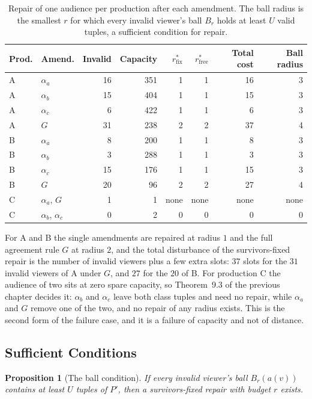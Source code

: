 \documentclass[11pt,twoside,openright]{book}
\theoremstyle{plain}
\newtheorem{proposition}[theorem]{Proposition}
\theoremstyle{definition}
\theoremstyle{remark}
\begin{document}
\begin{table}[ht]
\centering
\begin{tabular}{@{}llrrrrrr@{}}
\toprule
Prod. & Amend. & Invalid & Capacity & $r^\ast_{\mathrm{fix}}$ & $r^\ast_{\mathrm{free}}$ & Total cost & Ball radius\\
\midrule
A & $\alpha_a$ & 16 & 351 & 1 & 1 & 16 & 3\\
A & $\alpha_b$ & 15 & 404 & 1 & 1 & 15 & 3\\
A & $\alpha_c$ & 6 & 422 & 1 & 1 & 6 & 3\\
A & $G$ & 31 & 238 & 2 & 2 & 37 & 4\\
B & $\alpha_a$ & 8 & 200 & 1 & 1 & 8 & 3\\
B & $\alpha_b$ & 3 & 288 & 1 & 1 & 3 & 3\\
B & $\alpha_c$ & 15 & 176 & 1 & 1 & 15 & 3\\
B & $G$ & 20 & 96 & 2 & 2 & 27 & 4\\
C & $\alpha_a$, $G$ & 1 & 1 & none & none & none & none\\
C & $\alpha_b$, $\alpha_c$ & 0 & 2 & 0 & 0 & 0 & 0\\
\bottomrule
\end{tabular}
\caption{Repair of one audience per production after each amendment. The ball radius is the smallest $r$ for which every invalid viewer's ball $B_r$ holds at least $U$ valid tuples, a sufficient condition for repair.}\label{tab:repair}
\end{table}

For A and B the single amendments are repaired at radius $1$ and the full agreement rule $G$ at radius $2$, and the total disturbance of the survivors-fixed repair is the number of invalid viewers plus a few extra slots: $37$ slots for the $31$ invalid viewers of A under $G$, and $27$ for the $20$ of B. For production C the audience of two sits at zero spare capacity, so Theorem~9.3 of the previous chapter decides it: $\alpha_b$ and $\alpha_c$ leave both class tuples and need no repair, while $\alpha_a$ and $G$ remove one of the two, and no repair of any radius exists. This is the second form of the failure case, and it is a failure of capacity and not of distance.

\subsection{Sufficient Conditions}

\begin{proposition}[The ball condition]\label{prop:ball}
If every invalid viewer's ball $B_r(a(v))$ contains at least $U$ tuples of $P'$, then a survivors-fixed repair with budget $r$ exists.
\end{proposition}
\end{document}
